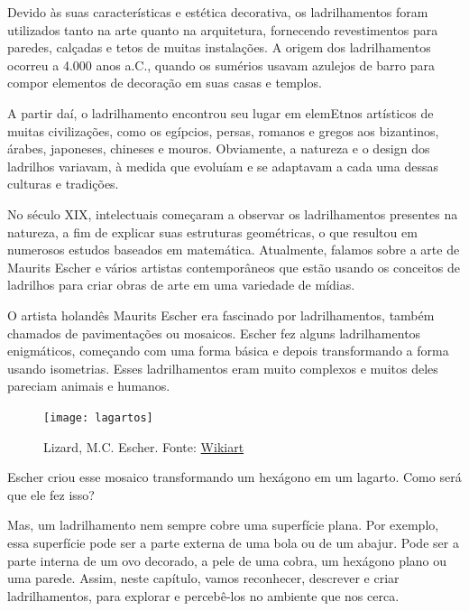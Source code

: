 \mainmatter


\label{ladri-exp-1}

Devido às suas características e estética decorativa, os ladrilhamentos foram utilizados tanto na arte quanto na arquitetura, fornecendo revestimentos para paredes, calçadas e tetos de muitas instalações. A origem dos ladrilhamentos ocorreu a 4.000 anos a.C., quando os sumérios usavam azulejos de barro para compor elementos de decoração em suas casas e templos. 

A partir daí, o ladrilhamento encontrou seu lugar em elemEtnos artísticos de muitas civilizações, como os egípcios, persas, romanos e gregos aos bizantinos, árabes, japoneses, chineses e mouros. Obviamente, a natureza e o design dos ladrilhos variavam, à medida que evoluíam e se adaptavam a cada uma dessas culturas e tradições. 

No século XIX, intelectuais começaram a observar os ladrilhamentos presentes na natureza, a fim de explicar suas estruturas geométricas, o que resultou em numerosos estudos baseados em matemática. Atualmente, falamos sobre a arte de Maurits Escher e vários artistas contemporâneos que estão usando os conceitos de ladrilhos para criar obras de arte em uma variedade de mídias.

O artista holandês Maurits Escher era fascinado por ladrilhamentos, também chamados de pavimentações ou mosaicos. Escher fez alguns ladrilhamentos enigmáticos, começando com uma forma básica e depois transformando a forma usando isometrias.  Esses ladrilhamentos eram muito complexos e muitos deles pareciam animais e humanos. 

\begin{figure}[H]
\centering
\texttt{[image: lagartos]}

\caption{Lizard, M.C. Escher. Fonte: \href{https://www.wikiart.org/en/m-c-escher/lizard-1}{Wikiart}}
\label{lad-fig-1}
\end{figure}

Escher criou esse mosaico transformando um hexágono em um lagarto. Como será que ele fez isso?

Mas, um ladrilhamento nem sempre cobre uma superfície plana. Por exemplo, essa  superfície pode ser a parte externa de uma bola ou de um abajur. Pode ser  a parte interna de um ovo decorado, a pele de uma cobra, um hexágono plano ou uma parede. Assim, neste capítulo, vamos reconhecer, descrever e criar ladrilhamentos, para explorar e percebê-los no ambiente que nos cerca.



